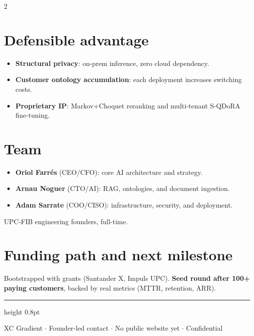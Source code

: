 \documentclass[10pt,a4paper]{article}
\begin{document}
\begin{multicols}{2}
\section{Defensible advantage}
\begin{itemize}[leftmargin=1em,itemsep=1pt,topsep=2pt]
\item \textbf{Structural privacy}: on-prem inference, zero cloud dependency.
\item \textbf{Customer ontology accumulation}: each deployment increases switching costs.
\item \textbf{Proprietary IP}: Markov+Choquet reranking and multi-tenant S-QDoRA fine-tuning.
\end{itemize}

\section{Team}
\begin{itemize}[leftmargin=1em,itemsep=1pt,topsep=2pt]
\item \textbf{Oriol Farr\'es} (CEO/CFO): core AI architecture and strategy.
\item \textbf{Arnau Noguer} (CTO/AI): RAG, ontologies, and document ingestion.
\item \textbf{Adam Sarrate} (COO/CISO): infrastructure, security, and deployment.
\end{itemize}
UPC-FIB engineering founders, full-time.

\section{Funding path and next milestone}
Bootstrapped with grants (Santander X, Impuls UPC). \textbf{Seed round after 100+ paying customers}, backed by real metrics (MTTR, retention, ARR).

\end{multicols}

\vspace{0.2em}
{\color{accent}\hrule height 0.8pt}
\vspace{0.15em}
\begin{center}
\small\textcolor{midgray}{XC Gradient $\cdot$ Founder-led contact $\cdot$ No public website yet $\cdot$ Confidential}
\end{center}
\end{document}
